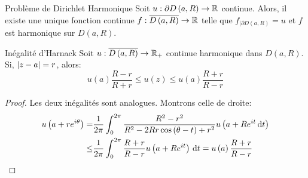 \documentclass{cours}
\begin{document}
\begin{corollaire}
	{Problème de Dirichlet Harmonique}{}
	Soit $u : \partial D\left(a, R\right) \to \mathbb{R}$ continue. Alors, il existe une unique fonction continue $f: \overline{D\left(a, R\right)} \to \mathbb{R}$ telle que $f_{\mid \partial D\left(a, R\right)} = u$ et $f$ est harmonique sur $D\left(a, R\right)$.
\end{corollaire}

\begin{propositionfr}
	{Inégalité d'Harnack}{}
	Soit $u : \overline{D\left(a, R\right)} \to \mathbb{R}_{+}$ continue harmonique dans $D\left(a, R\right)$. Si, $\left|z - a\right| = r$, alors:
	\begin{equation*}
		u\left(a\right) \frac{R - r}{R + r} \leq u\left(z\right) \leq u\left(a\right) \frac{R + r}{R - r}
	\end{equation*}
\end{propositionfr}
\begin{proof}
	Les deux inégalités sont analogues. Montrons celle de droite:
	\begin{equation*}
		\begin{aligned}
			u\left(a + re^{i \theta}\right) =& \frac{1}{2\pi}\int_{0}^{2\pi}\frac{R^{2} - r^{2}}{R^{2} - 2Rr\cos\left(\theta - t\right) + r^{2}}u\left(a + Re^{it}{\rm \, d} t\right)\\
				\leq & \frac{1}{2\pi} \int_{0}^{2\pi}\frac{R + r}{R - r}u\left(a + Re^{it}\right){\rm \, d} t = u\left(a\right)\frac{R + r}{R - r}
		\end{aligned}
	\end{equation*}
\end{proof}
\end{document}
